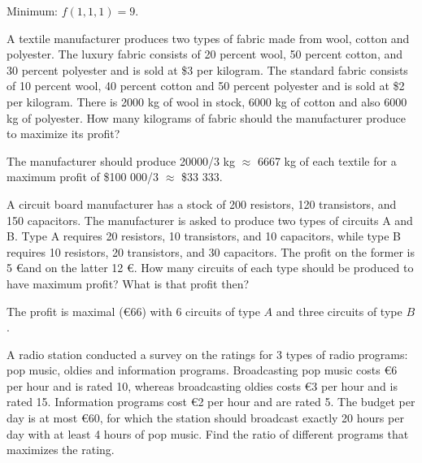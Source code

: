 \begin{Answer}
    Minimum: $f(1, 1, 1) = 9$.
\end{Answer}

\begin{Exercise}[difficulty = 2] A textile manufacturer produces two types of fabric made from wool, cotton and polyester. The luxury fabric consists of 20 percent wool, 50 percent cotton, and 30 percent polyester and is sold at \$3 per kilogram. The standard fabric consists of 10 percent wool, 40 percent cotton and 50 percent polyester and is sold at \$2 per kilogram. There is 2000 kg of wool in stock, 6000 kg of cotton and also 6000 kg of polyester. How many kilograms of fabric should the manufacturer produce to maximize its profit? 
\end{Exercise}

\begin{Answer}
    The manufacturer should produce 20000/3 kg $\approx$ 6667 kg of each textile for a maximum profit of \$100 000/3 $\approx$ \$33 333.
\end{Answer}

\begin{Exercise}[difficulty = 1] A circuit board manufacturer has a stock of 200 resistors, 120 transistors, and 150 capacitors. The manufacturer is asked to produce two types of circuits A and B. Type A requires 20 resistors, 10 transistors, and 10 capacitors, while type B requires 10 resistors, 20 transistors, and 30 capacitors. The profit on the former is 5 \euro and on the latter 12 \euro. How many circuits of each type should be produced to have maximum profit? What is that profit then?
\end{Exercise}

\begin{Answer}
    The profit is maximal (\euro 66) with 6 circuits of type $A$ and three circuits of type $B$.
\end{Answer}

\begin{Exercise}[difficulty = 2] A radio station conducted a survey on the ratings for 3 types of radio programs: pop music, oldies and information programs. Broadcasting pop music costs \euro 6 per hour and is rated 10, whereas broadcasting oldies  costs \euro 3 per hour and is rated 15. Information programs cost \euro 2 per hour and are rated 5.
The budget per day is at most \euro 60, for which the station should broadcast exactly 20 hours per day with at least 4 hours of pop music. Find the  ratio of different programs that maximizes the rating.
\end{Exercise}

